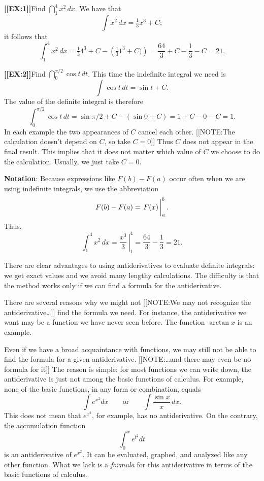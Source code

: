 {\bf [[EX:1]]}\quad  Find $\dint_1^4 x^2 \, dx$.  We have that
	\[
\int x^2 \, dx = \tfrac{1}{3} x^3 + C;
\]
it follows that
	\[
\int_1^4 x^2 \, dx = \tfrac{1}{3} 4^3 + C - 
		\left(\tfrac{1}{3}1^3 +C)\right) 
		= \dfrac{64}{3} + C - \dfrac{1}{3} - C = 21.
\]





{\bf [[EX:2]]}\quad Find $\dint_0^{\pi/2} \cos{t} \, dt$.  This time
the indefinite integral we need is
	\[
\int \cos{t} \, dt = \sin{t} + C.
\]
The value of the definite integral is therefore
	\[
\int_0^{\pi/2} \cos{t} \, dt = \sin{\pi/2} + C - 
		\left( \sin{0} + C \right) = 1 + C - 0 - C = 1.
\]
In each example the two appearances of $C$ cancel each other.  
[[NOTE:The calculation  doesn't depend on $C$,  so take $C = 0$]]
Thus $C$ does not appear in the final result.  This implies that it
does not matter which value of $C$ we choose to do the calculation.
Usually, we just take $C = 0$.






{\bf Notation}: Because expressions like $F(b) - F(a)$ occur
often when we are using indefinite integrals, we use the abbreviation
	\[
F(b) - F(a) = 
		\left. F(x) \rule{0pt}{14pt}\,
		\right|_a^b.
\]
Thus,
	\[
\int_1^4 x^2 \, dx = \left. \dfrac{x^3}{3} \, \right|_1^4
		= \dfrac{64}{3} - \dfrac{1}{3} = 21.
\]




There are clear advantages to using antiderivatives to evaluate
definite integrals: we get exact values and we avoid many lengthy
calculations.  The difficulty is that the method works only if we can
find a formula for the antiderivative.

There are several reasons why we might not 
[[NOTE:We may not recognize the \mbox{antiderivative\ldots}]]	
find the formula we need.  For instance, the antiderivative we want
may be a function we have never seen before.  The function
$\arctan{x}$ is an example.

Even if we have a broad acquaintance with functions, we may still not
be able to find the formula for a given antiderivative.
[[NOTE:\ldots and there may even be no formula for it]]	
The reason is simple: for most functions we can write down, the
antiderivative is just not among the basic functions of calculus.  For
example, none of the basic functions, in any form or combination,
equals
	\[
\int e^{x^2} dx \qquad \mbox{or} \qquad
		\int \dfrac{\sin{x}}{x} \, dx.
\]
This does not mean that $e^{x^2}$, for example, has no
antiderivative.  On the contrary, the accumulation function
	\[
\int_0^x e^{t^2} dt
\]
is an antiderivative of $e^{x^2}$.  It can be evaluated, graphed, and
analyzed like any other function.  What we lack is a {\em formula\/}
for this antiderivative in terms of the basic functions of calculus.


